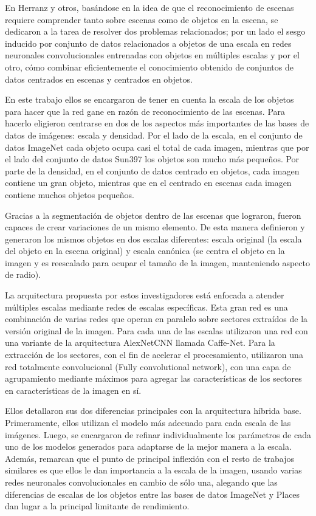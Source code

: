 En \cite{scene_recognition_cnn} Herranz y otros, basándose en la idea de que el reconocimiento de escenas requiere comprender tanto sobre escenas como de objetos en la escena, se dedicaron a la tarea de resolver dos problemas relacionados; por un lado el sesgo inducido por conjunto de datos relacionados a objetos de una escala en redes neuronales convolucionales entrenadas con objetos en múltiples escalas y por el otro, cómo combinar eficientemente el conocimiento obtenido de conjuntos de datos centrados en escenas y centrados en objetos.

En este trabajo ellos se encargaron de tener en cuenta la escala de los objetos para hacer que la red gane en razón de reconocimiento de las escenas. Para hacerlo eligieron centrarse en dos de los aspectos más importantes de las bases de datos de imágenes: escala y densidad. Por el lado de la escala, en el conjunto de datos ImageNet cada objeto ocupa casi el total de cada imagen, mientras que por el lado del conjunto de datos Sun397 los objetos son mucho más pequeños. Por parte de la densidad, en el conjunto de datos centrado en objetos, cada imagen contiene un gran objeto, mientras que en el centrado en escenas cada imagen contiene muchos objetos pequeños.

Gracias a la segmentación de objetos dentro de las escenas que lograron, fueron capaces de crear variaciones de un mismo elemento. De esta manera definieron y generaron los mismos objetos en dos escalas diferentes: escala original (la escala del objeto en la escena original) y escala canónica (se centra el objeto en la imagen y es reescalado para ocupar el tamaño de la imagen, manteniendo aspecto de radio).

La arquitectura propuesta por estos investigadores está enfocada a atender múltiples escalas mediante redes de escalas específicas. Esta gran red es una combinación de varias redes que operan en paralelo sobre sectores extraídos de la versión original de la imagen. Para cada una de las escalas utilizaron una red con una variante de la arquitectura AlexNetCNN llamada Caffe-Net. Para la extracción de los sectores, con el fin de acelerar el procesamiento, utilizaron una red totalmente convolucional (Fully convolutional network), con una capa de agrupamiento mediante máximos para agregar las características de los sectores en características de la imagen en sí.

Ellos detallaron sus dos diferencias principales con la arquitectura híbrida base. Primeramente, ellos utilizan el modelo más adecuado para cada escala de las imágenes. Luego, se encargaron de refinar individualmente los parámetros de cada uno de los modelos generados para adaptarse de la mejor manera a la escala. Además, remarcan que el punto de principal inflexión con el resto de trabajos similares es que ellos le dan importancia a la escala de la imagen, usando varias redes neuronales convolucionales en cambio de sólo una, alegando que las diferencias de escalas de los objetos entre las bases de datos ImageNet y Places dan lugar a la principal limitante de rendimiento.

